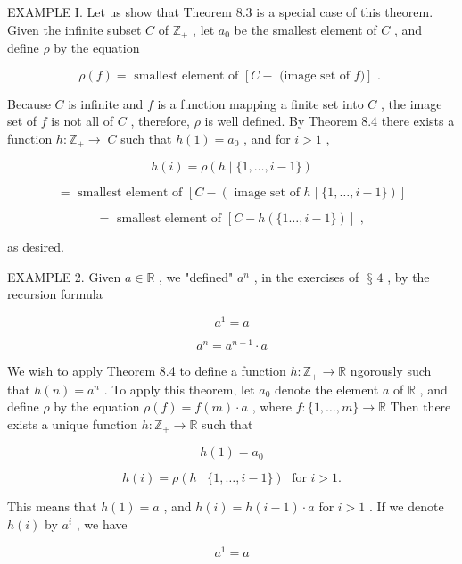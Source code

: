 \documentclass[10pt]{article}
\begin{document}
EXAMPLE I. Let us show that Theorem 8.3 is a special case of this theorem. Given the infinite subset \(C\) of \({\mathbb{Z}}_{ + }\) , let \({a}_{0}\) be the smallest element of \(C\) , and define \(\rho\) by the equation

\[
\rho \left( f\right)  = \text{ smallest element of }\left\lbrack  {C - \text{ (image set of }f)}\right\rbrack  \text{ . }
\]

Because \(C\) is infinite and \(f\) is a function mapping a finite set into \(C\) , the image set of \(f\) is not all of \(C\) , therefore, \(\rho\) is well defined. By Theorem 8.4 there exists a function \(h : {\mathbb{Z}}_{ + } \rightarrow \; C\) such that \(h\left( 1\right)  = {a}_{0}\) , and for \(i > 1\) ,

\[
h\left( i\right)  = \rho \left( {h\mid \{ 1,\ldots ,i - 1\} }\right)
\]

\[
= \text{ smallest element of }\left\lbrack  {C - \left( {\text{ image set of }h\mid \{ 1,\ldots ,i - 1\} }\right) }\right\rbrack
\]

\[
= \text{ smallest element of }\left\lbrack  {C - h\left( {\{ 1\ldots ,i - 1\} }\right) }\right\rbrack  \text{ , }
\]

as desired.

EXAMPLE 2. Given \(a \in  \mathbb{R}\) , we "defined" \({a}^{n}\) , in the exercises of \(\text{ § }4\) , by the recursion formula

\[
{a}^{1} = a
\]

\[
{a}^{n} = {a}^{n - 1} \cdot  a
\]

We wish to apply Theorem 8.4 to define a function \(h : {\mathbb{Z}}_{ + } \rightarrow  \mathbb{R}\) ngorously such that \(h\left( n\right)  = {a}^{n}\) . To apply this theorem, let \({a}_{0}\) denote the element \(a\) of \(\mathbb{R}\) , and define \(\rho\) by the equation \(\rho \left( f\right)  = f\left( m\right)  \cdot  a\) , where \(f : \{ 1,\ldots ,m\}  \rightarrow  \mathbb{R}\) Then there exists a unique function \(h : {\mathbb{Z}}_{ + } \rightarrow  \mathbb{R}\) such that

\[
h\left( 1\right)  = {a}_{0}
\]

\[
h\left( i\right)  = \rho \left( {h\mid \{ 1,\ldots ,i - 1\} }\right) \;\text{ for }i > 1.
\]

This means that \(h\left( 1\right)  = a\) , and \(h\left( i\right)  = h\left( {i - 1}\right)  \cdot  a\) for \(i > 1\) . If we denote \(h\left( i\right)\) by \({a}^{i}\) , we have

\[
{a}^{1} = a
\]
\end{document}
